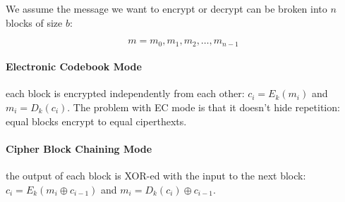\documentclass[12pt, letterpaper]{article}
\begin{document}
We assume the message we want to encrypt or decrypt can be broken into $n$ blocks of size $b$:

\[
  m = m_0, m_1, m_2, \dots, m_{n-1}
\]

\paragraph{Electronic Codebook Mode} each block is encrypted independently from each other: $c_i = E_k (m_i)$
and $m_i = D_k (c_i)$.
The problem with EC mode is that it doesn't hide repetition: equal blocks encrypt to equal ciperthexts.

\paragraph{Cipher Block Chaining Mode} the output of each block is XOR-ed with the input to the next block: $c_i = E_k (m_i \oplus c_{i - 1})$
and $m_{i} = D_k (c_{i}) \oplus c_{i-1}$.
\end{document}
